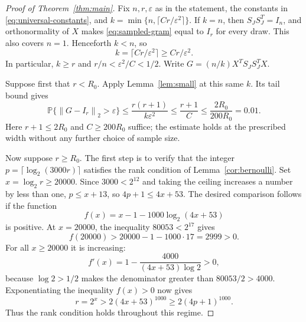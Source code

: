 \documentclass[11pt]{article}
\theoremstyle{definition}
\theoremstyle{remark}
\theoremstyle{plain}
\newcommand{\Prob}{\mathbb P}
\newcommand{\norm}[1]{\left\lVert#1\right\rVert_2}
\begin{document}
\begin{proof}[Proof of Theorem~\ref{thm:main}]
Fix $n,r,\varepsilon$ as in the statement, the constants in
\eqref{eq:universal-constants}, and
$k=\min\{n,\lceil Cr/\varepsilon^2\rceil\}$.
If $k=n$, then $S_JS_J^T=I_n$, and orthonormality of $X$ makes
\eqref{eq:sampled-gram} equal to $I_r$ for every draw.
This also covers $n=1$. Henceforth $k<n$, so
\begin{equation}\label{eq:nonfull-width}
 k=\lceil Cr/\varepsilon^2\rceil\ge Cr/\varepsilon^2.
\end{equation}
In particular, $k\ge r$ and $r/n<\varepsilon^2/C<1/2$.
Write $G=(n/k)X^TS_JS_J^TX$.

Suppose first that $r<R_0$. Apply Lemma~\ref{lem:small} at this
same $k$. Its tail bound gives
\[
 \Prob\{\norm{G-I_r}>\varepsilon\}
 \le\frac{r(r+1)}{k\varepsilon^2}
 \le\frac{r+1}{C}
 \le\frac{2R_0}{200R_0}=0.01.
\]
Here $r+1\le2R_0$ and $C\ge200R_0$ suffice; the estimate holds
at the prescribed width without any further choice of sample size.

Now suppose $r\ge R_0$. The first step is to verify that the
integer \(p=\lceil\log_2(3000r)\rceil\) satisfies the rank condition
of Lemma~\ref{cor:bernoulli}. Set $x=\log_2r\ge20000$.
Since $3000<2^{12}$ and taking the ceiling increases a number by
less than one, $p\le x+13$, so $4p+1\le4x+53$.
The desired comparison follows if the function
\[
 f(x)=x-1-1000\log_2(4x+53)
\]
is positive. At $x=20000$, the inequality $80053<2^{17}$ gives
\[
 f(20000)>20000-1-1000\cdot17=2999>0.
\]
For all $x\ge20000$ it is increasing:
\[
 f'(x)=1-\frac{4000}{(4x+53)\log2}>0,
\]
because $\log2>1/2$ makes the denominator greater than
$80053/2>4000$. Exponentiating the inequality $f(x)>0$ now gives
\[
 r=2^x>2(4x+53)^{1000}\ge2(4p+1)^{1000}.
\]
Thus the rank condition holds throughout this regime.


\end{proof}
\end{document}
